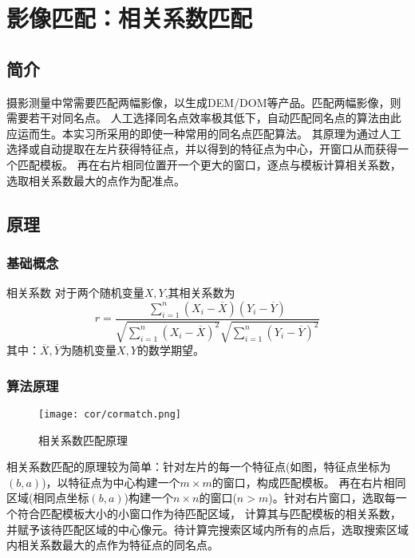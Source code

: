 \section{影像匹配：相关系数匹配}
\subsection{简介}

    摄影测量中常需要匹配两幅影像，以生成DEM/DOM等产品。匹配两幅影像，则需要若干对同名点。
    人工选择同名点效率极其低下，自动匹配同名点的算法由此应运而生。本实习所采用的即使一种常用的同名点匹配算法。
    其原理为通过人工选择或自动提取在左片获得特征点，并以得到的特征点为中心，开窗口从而获得一个匹配模板。
    再在右片相同位置开一个更大的窗口，逐点与模板计算相关系数，选取相关系数最大的点作为配准点。
\subsection{原理}
    \subsubsection{基础概念}
        \begin{theorem}{相关系数}{}
            对于两个随机变量$X,Y$,其相关系数为
            \begin{equation}
                \label{cor_cof}
                r=\frac{ \sum_{i=1}^n (X_i - \overline{X})(Y_i - \overline{Y}) }{ \sqrt{ \sum_{i=1}^n (X_i - \overline{X})^2 } \sqrt{ \sum_{i=1}^n (Y_i - \overline{Y})^2   } }
            \end{equation}
            其中：$\overline{X},\overline{Y}$为随机变量$X,Y$的数学期望。
        \end{theorem}
    \subsubsection{算法原理}
        
        \begin{figure}[H]
            \centering 
            \texttt{[image: cor/cormatch.png]}
            \caption{相关系数匹配原理}
            \label{cormatchpic}
        \end{figure}
        相关系数匹配的原理较为简单：针对左片的每一个特征点(如图，特征点坐标为$(b,a)$)，以特征点为中心构建一个$m \times m$的窗口，构成匹配模板。
        再在右片相同区域(相同点坐标$(b,a)$)构建一个$n \times n$的窗口($n > m$)。针对右片窗口，选取每一个符合匹配模板大小的小窗口作为待匹配区域，
        计算其与匹配模板的相关系数，并赋予该待匹配区域的中心像元。待计算完搜索区域内所有的点后，选取搜索区域内相关系数最大的点作为特征点的同名点。

